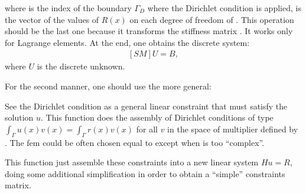 \documentclass[a4paper,11pt,english]{sphinxmanual}
\begin{document}
\begin{sphinxVerbatim}[commandchars=\\\{\}]
    
\end{sphinxVerbatim}

where  is the index of the boundary \(\Gamma_D\) where the Dirichlet
condition is applied,  is the vector of the values of \(R(x)\) on each
degree of freedom of . This operation should be the last one because it
transforms the stiffness matrix . It works only for Lagrange elements. At
the end, one obtains the discrete system:
\begin{equation*}
\begin{split}[SM] U = B,\end{split}
\end{equation*}
where \(U\) is the discrete unknown.

For the second manner, one should use the more general:

\begin{sphinxVerbatim}[commandchars=\\\{\}]
    
                                    
\end{sphinxVerbatim}

See the Dirichlet condition as a general linear constraint that must satisfy the
solution \(u\). This function does the assembly of Dirichlet conditions of
type \(\int_{\Gamma} u(x)v(x) = \int_{\Gamma}r(x)v(x)\) for all \(v\) in
the space of multiplier defined by . The fem  could be often
chosen equal to  except when  is too “complex”.

This function just assemble these constraints into a new linear system \(H
u=R\), doing some additional simplification in order to obtain a “simple”
constraints matrix.
\end{document}

